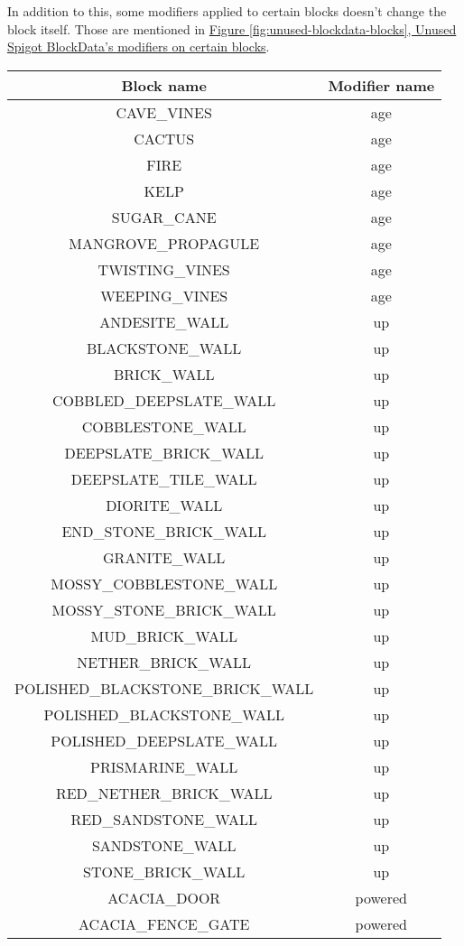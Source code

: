 In addition to this, some modifiers applied to certain blocks doesn't change the block itself. Those are mentioned in \hyperref[fig:unused-blockdata-blocks]{Figure \ref{fig:unused-blockdata-blocks}, Unused Spigot BlockData's modifiers on certain blocks}.

\begin{longtable}{ |c|c| }
	\hline
	Block name & Modifier name \\
	\hline
	\endhead
	CAVE\_VINES & age \\
	CACTUS & age \\
	FIRE & age \\
	KELP & age \\
	SUGAR\_CANE & age \\
	MANGROVE\_PROPAGULE & age \\
	TWISTING\_VINES & age \\
	WEEPING\_VINES & age \\
	\hline
	ANDESITE\_WALL & up \\
	BLACKSTONE\_WALL & up \\
	BRICK\_WALL & up \\
	COBBLED\_DEEPSLATE\_WALL & up \\
	COBBLESTONE\_WALL & up \\
	DEEPSLATE\_BRICK\_WALL & up \\
	DEEPSLATE\_TILE\_WALL & up \\
	DIORITE\_WALL & up \\
	END\_STONE\_BRICK\_WALL & up \\
	GRANITE\_WALL & up \\
	MOSSY\_COBBLESTONE\_WALL & up \\
	MOSSY\_STONE\_BRICK\_WALL & up \\
	MUD\_BRICK\_WALL & up \\
	NETHER\_BRICK\_WALL & up \\
	POLISHED\_BLACKSTONE\_BRICK\_WALL & up \\
	POLISHED\_BLACKSTONE\_WALL & up \\
	POLISHED\_DEEPSLATE\_WALL & up \\
	PRISMARINE\_WALL & up \\
	RED\_NETHER\_BRICK\_WALL & up \\
	RED\_SANDSTONE\_WALL & up \\
	SANDSTONE\_WALL & up \\
	STONE\_BRICK\_WALL & up \\
	\hline
	ACACIA\_DOOR & powered \\
	ACACIA\_FENCE\_GATE & powered \\

\end{longtable}
